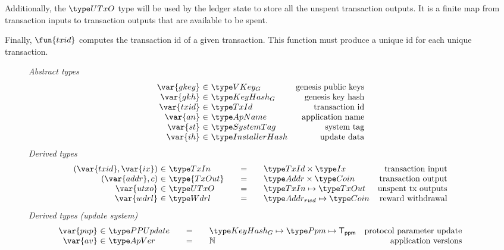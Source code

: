 Additionally, the $\UTxO$ type will be used by the ledger state to store all the
unspent transaction outputs. It is a finite map from transaction inputs
to transaction outputs that are available to be spent.

Finally, $\fun{txid}$ computes the transaction id of a given transaction.
This function must produce a unique id for each unique transaction.

\begin{figure*}[htb]
  \emph{Abstract types}
  \begin{equation*}
    \begin{array}{r@{~\in~}lr}
      \var{gkey} & \VKeyGen & \text{genesis public keys}\\
      \var{gkh} & \KeyHashGen & \text{genesis key hash}\\
      \var{txid} & \TxId & \text{transaction id}\\
      \var{an} & \ApName & \text{application name}\\
      \var{st} & \SystemTag & \text{system tag}\\
      \var{ih} & \InstallerHash & \text{update data}\\
    \end{array}
  \end{equation*}
  \emph{Derived types}
  \begin{equation*}
    \begin{array}{r@{~\in~}l@{\qquad=\qquad}lr}
      (\var{txid}, \var{ix})
      & \TxIn
      & \TxId \times \Ix
      & \text{transaction input}
      \\
      (\var{addr}, c)
      & \type{TxOut}
      & \Addr \times \Coin
      & \text{transaction output}
      \\
      \var{utxo}
      & \UTxO
      & \TxIn \mapsto \TxOut
      & \text{unspent tx outputs}
      \\
      \var{wdrl}
      & \Wdrl
      & \AddrRWD \mapsto \Coin
      & \text{reward withdrawal}
    \end{array}
  \end{equation*}
  \emph{Derived types (update system)}
  \begin{equation*}
    \begin{array}{r@{~\in~}l@{\qquad=\qquad}lr}
      \var{pup}
      & \PPUpdate
      & \KeyHashGen \mapsto \Ppm \mapsto \mathsf{T_{ppm}}
      & \text{protocol parameter update}
      \\
      \var{av}
      & \ApVer
      & \N
      & \text{application versions}

\end{array}
\end{equation*}
\end{figure*}
